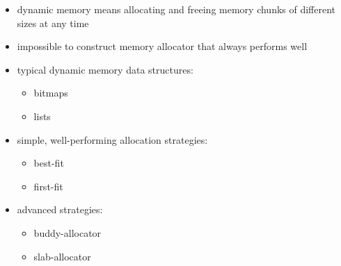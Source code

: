 \begin{summary}
  \begin{itemize}
    \item dynamic memory means allocating and freeing memory chunks of different sizes at any time
    \item impossible to construct memory allocator that always performs well
    \item typical dynamic memory data structures:
    \begin{itemize}
      \item bitmaps
      \item lists
    \end{itemize}
    \item simple, well-performing allocation strategies:
    \begin{itemize}
      \item best-fit
      \item first-fit 
    \end{itemize}
    \item advanced strategies:
    \begin{itemize}
      \item buddy-allocator
      \item slab-allocator 
    \end{itemize}
  \end{itemize}
\end{summary}